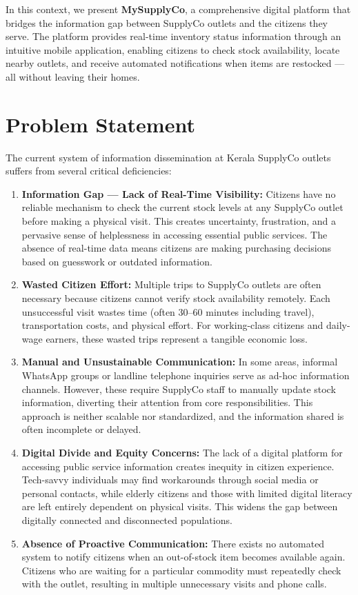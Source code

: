 In this context, we present \textbf{MySupplyCo}, a comprehensive digital platform that bridges the information gap between SupplyCo outlets and the citizens they serve. The platform provides real-time inventory status information through an intuitive mobile application, enabling citizens to check stock availability, locate nearby outlets, and receive automated notifications when items are restocked --- all without leaving their homes.

\section{Problem Statement}

The current system of information dissemination at Kerala SupplyCo outlets suffers from several critical deficiencies:

\begin{enumerate}[label=\arabic*.]
    \item \textbf{Information Gap --- Lack of Real-Time Visibility:} Citizens have no reliable mechanism to check the current stock levels at any SupplyCo outlet before making a physical visit. This creates uncertainty, frustration, and a pervasive sense of helplessness in accessing essential public services. The absence of real-time data means citizens are making purchasing decisions based on guesswork or outdated information.

    \item \textbf{Wasted Citizen Effort:} Multiple trips to SupplyCo outlets are often necessary because citizens cannot verify stock availability remotely. Each unsuccessful visit wastes time (often 30--60 minutes including travel), transportation costs, and physical effort. For working-class citizens and daily-wage earners, these wasted trips represent a tangible economic loss.

    \item \textbf{Manual and Unsustainable Communication:} In some areas, informal WhatsApp groups or landline telephone inquiries serve as ad-hoc information channels. However, these require SupplyCo staff to manually update stock information, diverting their attention from core responsibilities. This approach is neither scalable nor standardized, and the information shared is often incomplete or delayed.

    \item \textbf{Digital Divide and Equity Concerns:} The lack of a digital platform for accessing public service information creates inequity in citizen experience. Tech-savvy individuals may find workarounds through social media or personal contacts, while elderly citizens and those with limited digital literacy are left entirely dependent on physical visits. This widens the gap between digitally connected and disconnected populations.

    \item \textbf{Absence of Proactive Communication:} There exists no automated system to notify citizens when an out-of-stock item becomes available again. Citizens who are waiting for a particular commodity must repeatedly check with the outlet, resulting in multiple unnecessary visits and phone calls.
\end{enumerate}

